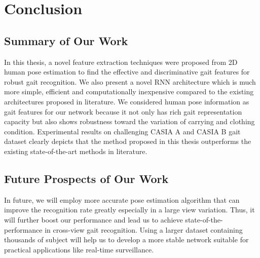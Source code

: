 \chapter{Conclusion}\label{ch:conclusion}

\section{Summary of Our Work}
In this thesis, a novel feature extraction techniques were proposed from 2D human pose estimation to find the effective and discriminative gait features for robust gait recognition. We also present a novel RNN architecture which is much more simple, efficient and computationally inexpensive compared to the existing architectures proposed in literature. We considered human pose information as gait features for our network because it not only has rich gait representation capacity but also shows robustness toward the variation of carrying and clothing condition. Experimental results on challenging CASIA A and CASIA B gait dataset clearly depicts that the method proposed in this thesis outperforms the existing state-of-the-art methods in literature.


\section{Future Prospects of Our Work}
In future, we will employ more accurate pose estimation algorithm that can improve the recognition rate greatly especially in a large view variation. Thus, it will further boost our performance and lead us to achieve state-of-the-performance in cross-view gait recognition. Using a larger dataset containing thousands of subject will help us to develop a more stable network suitable for practical applications like real-time surveillance. 







